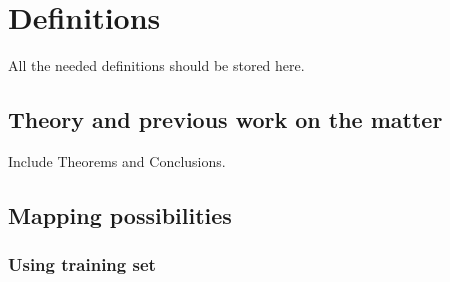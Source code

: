 \documentclass[
	ngerman,
	ruledheaders=section,%
	class=report,%
	thesis={type=bachelor},%
	accentcolor=9c,%
	custommargins=true,%
	marginpar=false,%
	parskip=half-,%
	fontsize=11pt,%
	logofile=tud_logo.png, %
]{tudapub}
\newcommand*{\FeatureTrue}{\ding{52}}
\newcommand*{\FeatureFalse}{\ding{56}}
\begin{document}
\begin{comment}
\noindent
\begin{tabularx}{\linewidth}{@{}p{.25\linewidth}*3{>{\centering\arraybackslash}X}@{}}
	\toprule
	Option&DEMO-TUDaThesis&DEMO-TUDaPhD&DEMO-TUDapub\\
	\midrule
	twoside&\FeatureFalse&\FeatureTrue&\FeatureFalse\\\midrule
	parskip&\FeatureTrue&\FeatureFalse&\FeatureTrue\\\midrule
	Kolophon&\FeatureFalse&\FeatureTrue&\FeatureFalse\\\midrule
	Widmung&\FeatureFalse&\FeatureTrue&\FeatureFalse\\\midrule
	Schriftgröße&11pt&11pt&9pt\\\midrule
	ruledheaders&section&chapter&all\\\midrule
	Basisklasse&scrreprt&scrbook&scrartcl\\\midrule
	thesis&\ttfamily type=bachelor&\ttfamily type=dr, dr=rernat
	&\FeatureFalse\\\midrule
	marginpar&\FeatureFalse&\FeatureFalse&\FeatureTrue\\\midrule
	Affidavit\newline\rlap{(Selbstständigkeitserklärung)}&\FeatureTrue&\FeatureTrue&\FeatureFalse\\\midrule
	abstract&\FeatureFalse&\FeatureTrue&\FeatureTrue\\\midrule
	custommargins&\FeatureTrue&\FeatureTrue&\FeatureFalse\\
	\bottomrule
\end{tabularx}
\end{comment}

\chapter{Definitions}

All the needed definitions should be stored here.
\pagebreak
\section{Theory and previous work on the matter}

Include Theorems and Conclusions.
\pagebreak
\section{Mapping possibilities}

\subsection{Using training set}
\pagebreak
\end{document}
